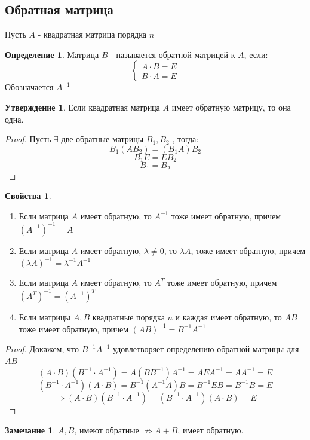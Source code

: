 \documentclass[a4paper, 12pt]{article}
\newcommand\tab[1][.5cm]{\hspace*{#1}}
\theoremstyle{definition}
\newtheorem*{definition}{Определение}
\newtheorem*{subtheorem}{Утверждение}
\newtheorem*{remark}{Замечание}
\newtheorem*{properties}{Свойства}
\begin{document}
  \subsection{Обратная матрица}
  Пусть $A$ - квадратная матрица порядка $n$ 
  \begin{definition}
    Матрица $B$ - называется обратной матрицей к $A$, если:
    $$\begin{cases}
      A \cdot B = E \\
      B \cdot A = E
    \end{cases}$$
    Обозначается $A^{-1}$ 
  \end{definition} 
  \begin{subtheorem}
    Если квадратная матрица $A$ имеет обратную матрицу, то она одна. 
  \end{subtheorem} 
  \begin{proof}
    Пусть $\exists $ две обратные матрицы $B_1, B_2$ , тогда: 
    $$B_1(AB_2) = (B_1A)B_2$$ 
    $$B_1 E = E B_2$$
    $$B_1 = B_2$$  
  \end{proof} 
  \begin{properties}  \tab
    \begin{enumerate}
      \item Если матрица $A$ имеет обратную, то $A^{-1}$ тоже имеет обратную, причем \\$(A^{-1})^{-1} = A$ \label{pro1} 
      \item Если матрица $A$ имеет обратную, $\lambda \not =0$, то $\lambda A$, тоже имеет обратную, причем $(\lambda A)^{-1} = \lambda^{-1} A^{-1}$ 
      \item Если матрица $A$ имеет обратную, то $A^{T}$ тоже имеет обратную, причем \\$(A^{T})^{-1} = (A^{-1})^{T}$
      \item Если матрицы $A,B$ квадратные порядка $n$ и каждая имеет обратную, то $AB$ тоже имеет обратную, причем $(AB)^{-1} = B^{-1}A^{-1}$ \label{pro4} 
    \end{enumerate}
  \end{properties}
  \begin{proof}
    Докажем, что $B^{-1} A^{-1} $ удовлетворяет определению обратной матрицы для $AB$ 
    $$(A\cdot B)(B^{-1}\cdot A^{-1}) = A(BB^{-1})A^{-1} = AEA^{-1} = AA^{-1} = E$$
    $$(B^{-1}\cdot A^{-1})(A\cdot B) = B^{-1}(A^{-1}A)B = B^{-1}EB = B^{-1}B=E$$  
    $$\Longrightarrow (A\cdot B)(B^{-1}\cdot A^{-1}) = (B^{-1}\cdot A^{-1})(A\cdot B) = E$$ 
  \end{proof} 
  \begin{remark}
    $A,B$, имеют обратные $\not \Rightarrow A+B$, имеет обратную.
  \end{remark} 
\end{document}
